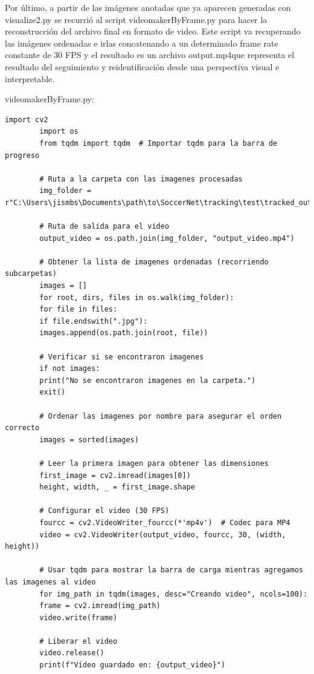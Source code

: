 \documentclass[12pt, a4paper, twoside]{article}
\begin{document}
	\vspace{0.5cm}
	Por último, a partir de las imágenes anotadas que ya aparecen generadas con visualize2.py se recurrió al script videomakerByFrame.py para hacer la reconstrucción del archivo final en formato de video. Este script va recuperando las imágenes ordenadas e irlas concatenando a un determinado frame rate constante de 30 FPS y el resultado es un archivo output.mp4que representa el resultado del seguimiento y reidentificación desde una perspectiva visual e interpretable.
	
	videomakerByFrame.py:
	\vspace{0.5cm}
	\begin{lstlisting}[style=pythonstyle]
		import cv2
		import os
		from tqdm import tqdm  # Importar tqdm para la barra de progreso
		
		# Ruta a la carpeta con las imagenes procesadas
		img_folder = r"C:\Users\jismbs\Documents\path\to\SoccerNet\tracking\test\tracked_output"
		
		# Ruta de salida para el video
		output_video = os.path.join(img_folder, "output_video.mp4")
		
		# Obtener la lista de imagenes ordenadas (recorriendo subcarpetas)
		images = []
		for root, dirs, files in os.walk(img_folder):
		for file in files:
		if file.endswith(".jpg"):
		images.append(os.path.join(root, file))
		
		# Verificar si se encontraron imagenes
		if not images:
		print("No se encontraron imagenes en la carpeta.")
		exit()
		
		# Ordenar las imagenes por nombre para asegurar el orden correcto
		images = sorted(images)
		
		# Leer la primera imagen para obtener las dimensiones
		first_image = cv2.imread(images[0])
		height, width, _ = first_image.shape
		
		# Configurar el video (30 FPS)
		fourcc = cv2.VideoWriter_fourcc(*'mp4v')  # Codec para MP4
		video = cv2.VideoWriter(output_video, fourcc, 30, (width, height))
		
		# Usar tqdm para mostrar la barra de carga mientras agregamos las imagenes al video
		for img_path in tqdm(images, desc="Creando video", ncols=100):
		frame = cv2.imread(img_path)
		video.write(frame)
		
		# Liberar el video
		video.release()
		print(f"Video guardado en: {output_video}")
	\end{lstlisting}
	\vspace{0.5cm}
	
\end{document}
